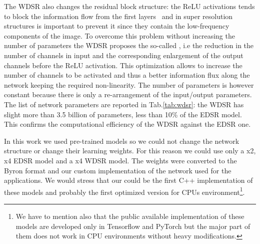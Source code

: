 \documentclass{standalone}
\begin{document}
The WDSR also changes the residual block structure: the ReLU activations tends to block the information flow from the first layers~\cite{} and in super resolution structures is important to prevent it since they contain the low-frequency components of the image.
To overcome this problem without increasing the number of parameters the WDSR proposes the so-called , i.e the reduction in the number of channels in input and the corresponding enlargement of the output channels before the ReLU activation.
This optimization allows to increase the number of channels to be activated and thus a better information flux along the network keeping the required non-linearity.
The number of parameters is however constant because there is only a re-arrangement of the input/output parameters.
The list of network parameters are reported in Tab.\ref{tab:wdsr}: the WDSR has slight more than 3.5 billion of parameters, less than 10\% of the EDSR model.
This confirms the computational efficiency of the WDSR against the EDSR one.

In this work we used pre-trained models so we could not change the network structure or change their learning weights.
For this reason we could use only a x2, x4 EDSR model and a x4 WDSR model.
The weights were converted to the Byron format and our custom implementation of the network used for the applications.
We would stress that our could be the first C++ implementation of these models and probably the first optimized version for CPUs environment\footnote{
  We have to mention also that the public available implementation of these models are developed only in Tensorflow and PyTorch but the major part of them does not work in CPU environments without heavy modifications.
}.
\end{document}
